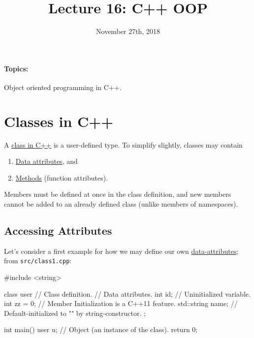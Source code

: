 \documentclass[12pt,letterpaper,twoside]{article}
\begin{document}
\title{Lecture 16: C++ OOP\vspace{-5ex}}
\date{November 27th, 2018}
\maketitle

{\footnotesize
\paragraph{Topics:} Object oriented programming in C++.
}
\vspace{-3ex}

\section{Classes in C++}
A \href{https://en.cppreference.com/w/cpp/language/classes}{class in C++} 
is a user-defined type. To simplify slightly, classes may contain
\begin{enumerate}   \item \href{https://en.cppreference.com/w/cpp/language/data_members}{Data attributes}, and
  \item \href{https://en.cppreference.com/w/cpp/language/member_functions}
    {Methods} (function attributes).
\end{enumerate}

Members must be defined at once in the class definition, and new members cannot
be added to an already defined class (unlike members of namespaces). 

\subsection{Accessing Attributes}
Let's consider a first example for how we may define our own 
\href{https://en.cppreference.com/w/cpp/language/data_members}
{data-attributes};
from \texttt{src/class1.cpp}:

\begin{cpp}
#include <string>

class user {           // Class definition.
  // Data attributes.
  int id;              // Uninitialized variable.
  int zz = 0;          // Member Initialization is a C++11 feature.
  std::string name;    // Default-initialized to "" by string-constructor.
};

int main() {
  user u;              // Object (an instance of the class).
  return 0;
}
\end{cpp}
\end{document}

